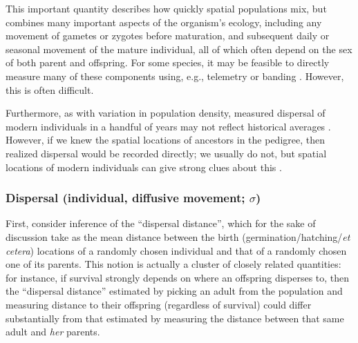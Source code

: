 \documentclass{ar-1col}
\begin{document}
This important quantity describes how quickly spatial populations mix,
but combines many important aspects of the organism's ecology, including
any movement of gametes or zygotes before maturation,
and subsequent daily or seasonal movement of the mature individual,
all of which often depend on the sex of both parent and offspring.
For some species,
it may be feasible to directly measure many of these components
using, e.g., telemetry or banding \citep{dispersal_estimation}.
However, this is often difficult.

Furthermore, as with variation in population density,
measured dispersal of modern individuals in a handful of years
may not reflect historical averages \citep{WhitlockMcCauley1999}.
However, 
if we knew the spatial locations of ancestors in the pedigree,
then realized dispersal would be recorded directly;
we usually do not, but spatial locations of modern individuals
can give strong clues about this \citep{Cayuela2018demographic}.


\subsubsection{Dispersal (individual, diffusive movement; $\sigma$)}

First, consider inference of the ``dispersal distance'',
which for the sake of discussion take as
the mean distance between the birth (germination/hatching/\textit{et cetera})
locations of a randomly chosen individual
and that of a randomly chosen one of its parents.
This notion is actually a cluster of closely related quantities:
for instance, if survival strongly depends on where an offspring disperses to,
then the ``dispersal distance'' estimated by picking an adult from the population
and measuring distance to their offspring (regardless of survival)
could differ substantially from that estimated by measuring the distance between that same adult
and \textit{her} parents.
\end{document}
